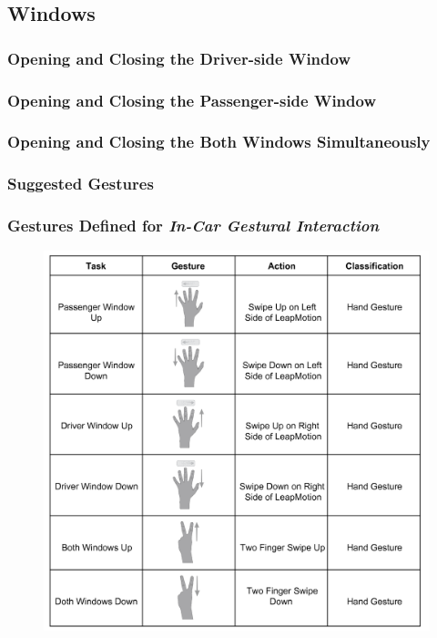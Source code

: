 \documentclass{l4proj}
\begin{document}
\subsection{Windows}
\vspace{-3mm}
\subsubsection{Opening and Closing the Driver-side Window}
\vspace{-3mm}
\subsubsection{Opening and Closing the Passenger-side Window}
\vspace{-3mm}
\subsubsection{Opening and Closing the Both Windows Simultaneously}
\vspace{-3mm}
\subsubsection{Suggested Gestures}
\vspace{-3mm}
\subsubsection{Gestures Defined for \it{In-Car Gestural Interaction}}
\begin{figure}[h!]
\centering
\includegraphics[width=6in]{images/LeapWindowGestures.png}
\label{fig:leapwindow}
\end{figure}
\newpage
\vspace{-3mm}
\end{document}
